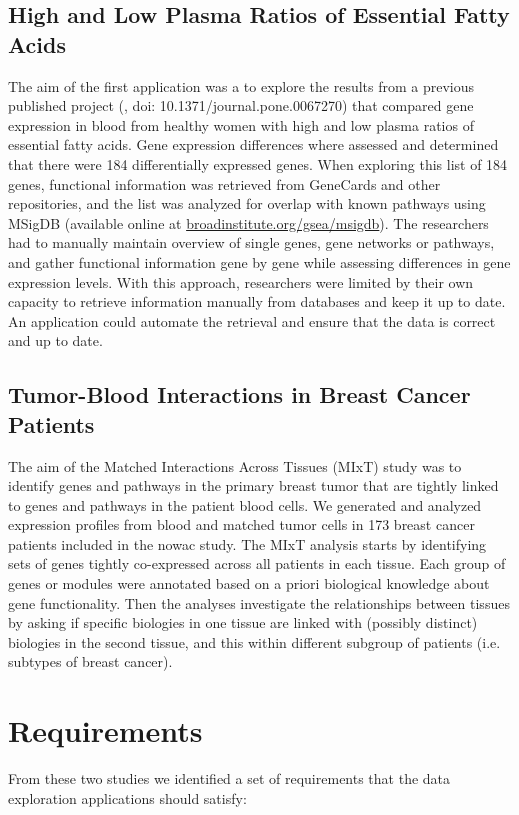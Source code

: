 \subsection{High and Low Plasma Ratios of Essential Fatty Acids} 
The aim of the first application was a to explore the
results from a previous published project (\cite{olsen2013plasma}, doi:
10.1371/journal.pone.0067270) that compared gene expression in blood from
healthy women with high and low plasma ratios of essential fatty acids. Gene
expression differences where assessed and determined that there were 184
differentially expressed genes. When exploring this list of 184 genes,
functional information was retrieved from GeneCards and other repositories, and
the list was analyzed for overlap with known pathways using MSigDB (available
online at
\href{broadinstitute.org/gsea/msigdb}{broadinstitute.org/gsea/msigdb}). The
researchers had to manually maintain overview of single genes, gene networks or
pathways, and gather functional information gene by gene while assessing
differences in gene expression levels. With this approach, researchers were
limited by their own capacity to retrieve information manually from databases
and keep it up to date. An application could automate the retrieval and ensure
that the data is correct and up to date. 

\subsection{Tumor-Blood Interactions in Breast Cancer Patients}
The aim of the Matched Interactions Across Tissues (MIxT) study was to identify
genes and pathways in the primary breast tumor that are tightly linked to genes
and pathways in the patient blood cells.\cite{dumeaux2017interactions} We
generated and analyzed expression profiles from blood and matched tumor cells in
173 breast cancer patients included in the \gls{nowac} 
study.  The MIxT analysis starts by identifying sets of genes tightly
co-expressed across all patients in each tissue. Each group of genes or modules
were annotated based on a priori biological knowledge about gene functionality.
Then the analyses investigate the relationships between tissues by asking if
specific biologies in one tissue are linked with (possibly distinct) biologies
in the second tissue, and this within different subgroup of patients (i.e.
subtypes of breast cancer).

\section{Requirements} 
From these two studies we identified a set of requirements that the data
exploration applications should satisfy: 

